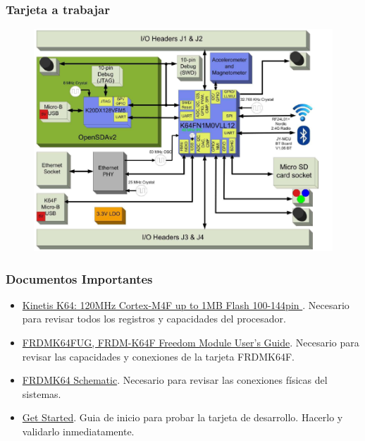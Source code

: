 \documentclass[10.5pt,scale=1.0,t,aspectratio=169,hyperref={pdfpagelabels=false}]{beamer}
\begin{document}
\begin{frame}
	\frametitle{Tarjeta a trabajar}
		\begin{figure}
			\centering
			\includegraphics[scale=0.4]{FRDMK64RMI}
		\end{figure}
\end{frame}

\begin{frame}
	\frametitle{Documentos Importantes}
	\begin{itemize}
		\item \href{https://www.nxp.com/products/processors-and-microcontrollers/arm-microcontrollers/general-purpose-mcus/k-series-cortex-m4/k6x-ethernet/kinetis-k64-120-mhz-256-kb-sram-microcontrollers-mcus-based-on-arm-cortex-m4-core:K64_120?tab=Documentation_Tab}{Kinetis K64: 120MHz Cortex-M4F up to 1MB Flash 100-144pin }. Necesario para revisar todos los registros y capacidades del procesador. 
		\item \href{https://www.nxp.com/design/development-boards/freedom-development-boards/mcu-boards/freedom-development-platform-for-kinetis-k64-k63-and-k24-mcus:FRDM-K64F}{FRDMK64FUG, FRDM-K64F Freedom Module User’s Guide}. Necesario para revisar las capacidades y conexiones de la tarjeta FRDMK64F.
		\item \href{https://www.nxp.com/design/development-boards/freedom-development-boards/mcu-boards/freedom-development-platform-for-kinetis-k64-k63-and-k24-mcus:FRDM-K64F}{FRDMK64 Schematic}. Necesario para revisar las conexiones físicas del sistemas.
		\item \href{https://www.nxp.com/document/guide/get-started-with-the-frdm-k64f:NGS-FRDM-K64F}{Get Started}. Guia de inicio para probar la tarjeta de desarrollo. Hacerlo y validarlo inmediatamente. 
	\end{itemize}
	
\end{frame}
\end{document}
